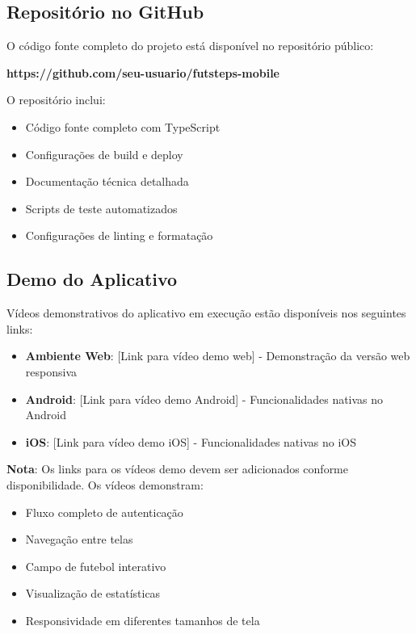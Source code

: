 \subsection{Repositório no GitHub}

O código fonte completo do projeto está disponível no repositório público:
\begin{center}
\textbf{https://github.com/seu-usuario/futsteps-mobile}
\end{center}

O repositório inclui:
\begin{itemize}
    \item Código fonte completo com TypeScript
    \item Configurações de build e deploy
    \item Documentação técnica detalhada
    \item Scripts de teste automatizados
    \item Configurações de linting e formatação
\end{itemize}

\subsection{Demo do Aplicativo}

Vídeos demonstrativos do aplicativo em execução estão disponíveis nos seguintes links:

\begin{itemize}
    \item \textbf{Ambiente Web}: [Link para vídeo demo web] - Demonstração da versão web responsiva
    \item \textbf{Android}: [Link para vídeo demo Android] - Funcionalidades nativas no Android
    \item \textbf{iOS}: [Link para vídeo demo iOS] - Funcionalidades nativas no iOS
\end{itemize}

\textbf{Nota}: Os links para os vídeos demo devem ser adicionados conforme disponibilidade. Os vídeos demonstram:
\begin{itemize}
    \item Fluxo completo de autenticação
    \item Navegação entre telas
    \item Campo de futebol interativo
    \item Visualização de estatísticas
    \item Responsividade em diferentes tamanhos de tela
\end{itemize}
